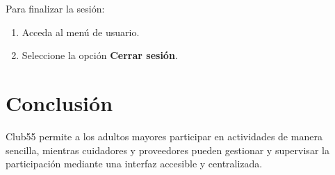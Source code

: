 \documentclass[12pt,a4paper]{article}
\begin{document}
Para finalizar la sesión:

\begin{enumerate}
\item Acceda al menú de usuario.
\item Seleccione la opción \textbf{Cerrar sesión}.
\end{enumerate}

\section{Conclusión}

Club55 permite a los adultos mayores participar en actividades de manera sencilla, mientras cuidadores y proveedores pueden gestionar y supervisar la participación mediante una interfaz accesible y centralizada.
\end{document}
